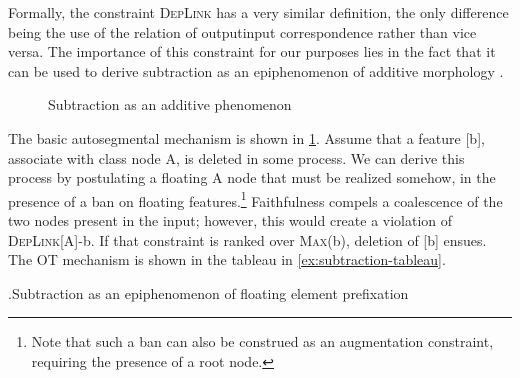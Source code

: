 Formally, the constraint \textsc{DepLink} has a very similar definition, the only difference being the use of the relation of output\endash input correspondence rather than vice versa. The importance of this constraint for our purposes lies in the fact that it can be used to derive subtraction as an epiphenomenon of additive morphology \citep[\cfm][]{bye09:_exten_expon_and_non_concat_morph}.

\begin{figure}[htp]
  \centering
  \caption{Subtraction as an additive phenomenon}
\label{fig:subtraction}
\end{figure}

The basic autosegmental mechanism is shown in \cref{fig:subtraction}. Assume that a feature [b], associate with class node A, is deleted in some process. We can derive this process by postulating a floating A node that must be realized somehow, in the presence of a ban on floating features.\footnote{Note that such a ban can also be construed as an augmentation constraint, requiring the presence of a root node.} Faithfulness compels a coalescence of the two nodes present in the input; however, this would create a violation of \textsc{DepLink}[A]-b. If that constraint is ranked over \textsc{Max}(b), deletion of [b] ensues. The OT mechanism is shown in the tableau in \ref{ex:subtraction-tableau}.

\ex.\label{ex:subtraction-tableau}Subtraction as an epiphenomenon of floating element prefixation\\


